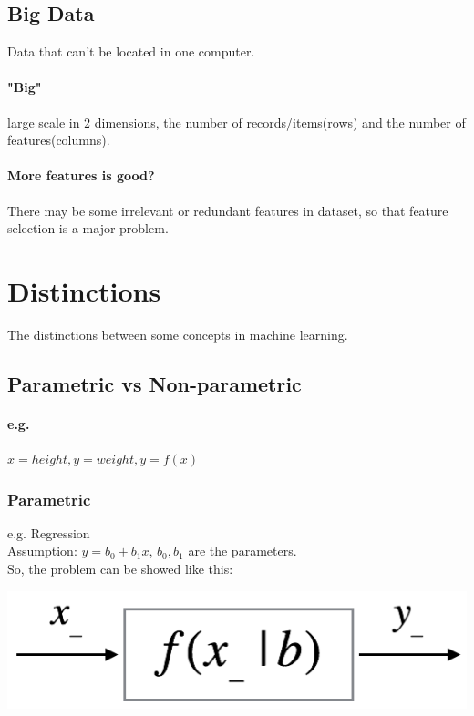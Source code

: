 \documentclass{article}
\begin{document}
{{    \subsection{Big Data}{
        Data that can't be located in one computer.
        \paragraph{"Big"}{
            large scale in 2 dimensions, the number of records/items(rows) and the number of features(columns).
        }
        \paragraph{More features is good?}{
            There may be some irrelevant or redundant features in dataset, so that feature selection is a major problem.
        }
    }   
}
\section{Distinctions}{
    The distinctions between some concepts in machine learning.
    \subsection{Parametric vs Non-parametric}{
        \paragraph{e.g.}{
            \(x = height, y = weight, y = f(x)\)
        }
        \subsubsection{Parametric}{
            e.g. Regression\\
            Assumption: $y = b_0 + b_1 x$, $b_0, b_1$ are the parameters.\\
            So, the problem can be showed like this:

            \begin{center}{
                \includegraphics[scale=0.5]{f(x_|b).png}
            }
            \end{center}

}}}}
\end{document}
